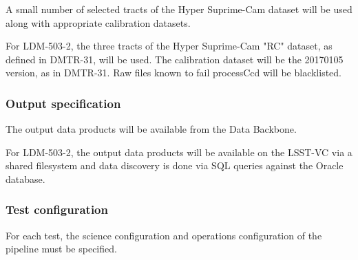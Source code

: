 A small number of selected tracts of the Hyper Suprime-Cam dataset will be used along with appropriate calibration datasets.

For LDM-503-2, the three tracts of the Hyper Suprime-Cam "RC" dataset, as defined in DMTR-31, will be used.
The calibration dataset will be the 20170105 version, as in DMTR-31.   Raw files known to fail processCcd 
will be blacklisted.

\subsubsection{Output specification}

The output data products will be available from the Data Backbone.

For LDM-503-2, the output data products will be available on the LSST-VC via a shared filesystem and data discovery is done via SQL queries against the Oracle database.


\subsubsection{Test configuration}\label{sec:configuration}

For each test, the science configuration and operations configuration of the pipeline must be specified.

